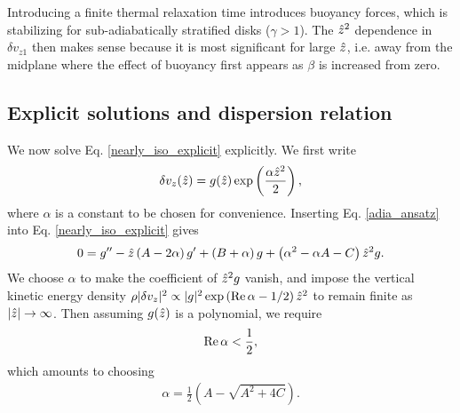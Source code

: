 

Introducing a finite thermal relaxation time introduces buoyancy
forces, which is stabilizing for sub-adiabatically stratified disks
($\gamma > 1$). The $\hat{z}^2$ dependence in $\delta v_{z1}$ then makes
sense because it is most significant for large $\hat{z}$, i.e. away from
the midplane where the effect of buoyancy first appears as $\beta$ is
increased from zero. 

\subsection{Explicit solutions and dispersion relation}\label{disp_relax}
We now solve Eq. \ref{nearly_iso_explicit} explicitly. We first write  
\begin{align}
  \delta v_z(\hat{z}) =
  g(\hat{z})\exp\left(\frac{\alpha\hat{z}^2}{2}\right), \label{adia_ansatz}
\end{align}
where $\alpha$ is a constant to be chosen for convenience. Inserting
Eq. \ref{adia_ansatz} into Eq. \ref{nearly_iso_explicit} gives
\begin{align}
  0 = g^{\prime\prime} - \hat{z}\left(A - 2\alpha\right)g^\prime + \left(B +
    \alpha\right)g
  +\left(\alpha^2 - \alpha A - C\right)\hat{z}^2 g.
\end{align}
We choose $\alpha$ to make the coefficient of $\hat{z}^2g$
vanish, and impose the vertical kinetic energy density
$\rho|\delta v_z|^2\propto |g|^2 \exp{\left(\operatorname{Re}\alpha -
    1/2\right)\hat{z}^2}$ to remain finite as $|\hat{z}|\to\infty$. 
Then assuming $g(\hat{z})$ is a polynomial, we require  
\begin{align}
  \operatorname{Re}\alpha < \frac{1}{2}, 
\end{align}
which amounts to choosing 
\begin{align}
  \alpha = \frac{1}{2}\left(A - \sqrt{A^2 + 4C}\right).  
\end{align} 

